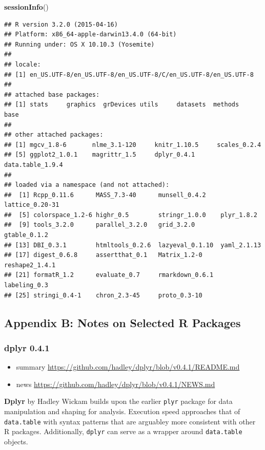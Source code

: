\documentclass[]{article}
\newenvironment{Shaded}{\begin{snugshade}}{\end{snugshade}}
\newcommand{\KeywordTok}[1]{\textcolor[rgb]{0.13,0.29,0.53}{\textbf{{#1}}}}
\newcommand{\NormalTok}[1]{{#1}}
\begin{document}
\begin{Shaded}
\begin{Highlighting}[]
\KeywordTok{sessionInfo}\NormalTok{()}
\end{Highlighting}
\end{Shaded}

\begin{verbatim}
## R version 3.2.0 (2015-04-16)
## Platform: x86_64-apple-darwin13.4.0 (64-bit)
## Running under: OS X 10.10.3 (Yosemite)
## 
## locale:
## [1] en_US.UTF-8/en_US.UTF-8/en_US.UTF-8/C/en_US.UTF-8/en_US.UTF-8
## 
## attached base packages:
## [1] stats     graphics  grDevices utils     datasets  methods   base     
## 
## other attached packages:
## [1] mgcv_1.8-6       nlme_3.1-120     knitr_1.10.5     scales_0.2.4    
## [5] ggplot2_1.0.1    magrittr_1.5     dplyr_0.4.1      data.table_1.9.4
## 
## loaded via a namespace (and not attached):
##  [1] Rcpp_0.11.6      MASS_7.3-40      munsell_0.4.2    lattice_0.20-31 
##  [5] colorspace_1.2-6 highr_0.5        stringr_1.0.0    plyr_1.8.2      
##  [9] tools_3.2.0      parallel_3.2.0   grid_3.2.0       gtable_0.1.2    
## [13] DBI_0.3.1        htmltools_0.2.6  lazyeval_0.1.10  yaml_2.1.13     
## [17] digest_0.6.8     assertthat_0.1   Matrix_1.2-0     reshape2_1.4.1  
## [21] formatR_1.2      evaluate_0.7     rmarkdown_0.6.1  labeling_0.3    
## [25] stringi_0.4-1    chron_2.3-45     proto_0.3-10
\end{verbatim}

\subsection{Appendix B: Notes on Selected R
Packages}\label{appendix-b-notes-on-selected-r-packages}

\subsubsection{dplyr 0.4.1}\label{dplyr-0.4.1}

\begin{itemize}
\itemsep1pt\parskip0pt
\item
  summary \url{https://github.com/hadley/dplyr/blob/v0.4.1/README.md}
\item
  news \url{https://github.com/hadley/dplyr/blob/v0.4.1/NEWS.md}
\end{itemize}

\textbf{Dplyr} by Hadley Wickam builds upon the earlier \texttt{plyr}
package for data manipulation and shaping for analysis. Execution speed
approaches that of \texttt{data.table} with syntax patterns that are
arguabley more consistent with other R packages. Additionally,
\texttt{dplyr} can serve as a wrapper around \texttt{data.table}
objects.
\end{document}
